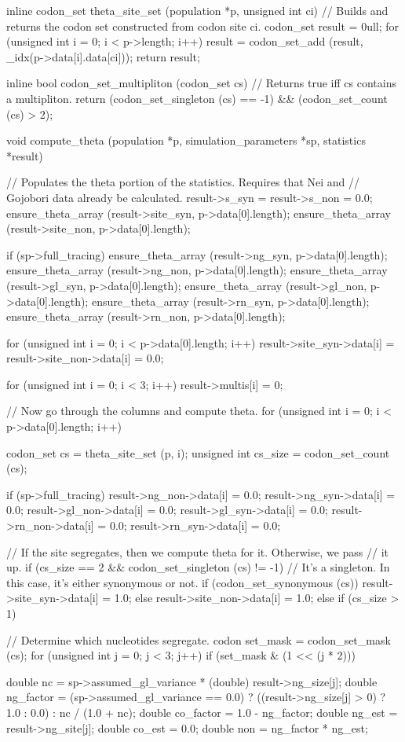\documentclass{article}
\begin{document}
\begin{ccode}
inline codon_set theta_site_set (population *p, unsigned int ci) {
  // Builds and returns the codon set constructed from codon site ci.
  codon_set result = 0ull;
  for (unsigned int i = 0; i < p->length; i++)
    result = codon_set_add (result, _idx(p->data[i].data[ci]));
  return result;
}

inline bool codon_set_multipliton (codon_set cs) {
  // Returns true iff cs contains a multipliton.
  return (codon_set_singleton (cs) == -1) && (codon_set_count (cs) > 2);
}

void compute_theta (population *p, simulation_parameters *sp, statistics *result) {
  // Populates the theta portion of the statistics. Requires that Nei and
  // Gojobori data already be calculated.
  result->s_syn = result->s_non = 0.0;
  ensure_theta_array (result->site_syn, p->data[0].length);
  ensure_theta_array (result->site_non, p->data[0].length);

  if (sp->full_tracing) {
    ensure_theta_array (result->ng_syn, p->data[0].length);
    ensure_theta_array (result->ng_non, p->data[0].length);
    ensure_theta_array (result->gl_syn, p->data[0].length);
    ensure_theta_array (result->gl_non, p->data[0].length);
    ensure_theta_array (result->rn_syn, p->data[0].length);
    ensure_theta_array (result->rn_non, p->data[0].length);
  }

  for (unsigned int i = 0; i < p->data[0].length; i++)
    result->site_syn->data[i] = result->site_non->data[i] = 0.0;

  for (unsigned int i = 0; i < 3; i++)
    result->multis[i] = 0;

  // Now go through the columns and compute theta.
  for (unsigned int i = 0; i < p->data[0].length; i++) {
    codon_set cs       	 = theta_site_set (p, i);
    unsigned int cs_size = codon_set_count (cs);

    if (sp->full_tracing) {
      result->ng_non->data[i]   = 0.0;
      result->ng_syn->data[i]   = 0.0;
      result->gl_non->data[i]   = 0.0;
      result->gl_syn->data[i]   = 0.0;
      result->rn_non->data[i]   = 0.0;
      result->rn_syn->data[i]   = 0.0;
    }

    // If the site segregates, then we compute theta for it. Otherwise, we pass
    // it up.
    if (cs_size == 2 && codon_set_singleton (cs) != -1) {
      // It's a singleton. In this case, it's either synonymous or not.
      if (codon_set_synonymous (cs))
	result->site_syn->data[i] = 1.0;
      else
	result->site_non->data[i] = 1.0;
    } else if (cs_size > 1) {
      // Determine which nucleotides segregate.
      codon set_mask = codon_set_mask (cs);
      for (unsigned int j = 0; j < 3; j++)
	if (set_mask & (1 << (j * 2))) {
	  double nc        = sp->assumed_gl_variance * (double) result->ng_size[j];
	  double ng_factor = (sp->assumed_gl_variance == 0.0) ?
			     ((result->ng_size[j] > 0) ? 1.0 : 0.0) :
			     nc / (1.0 + nc);
	  double co_factor = 1.0 - ng_factor;
	  double ng_est    = result->ng_site[j];
	  double co_est    = 0.0;
	  double non       = ng_factor * ng_est;

}}}}
\end{ccode}
\end{document}
